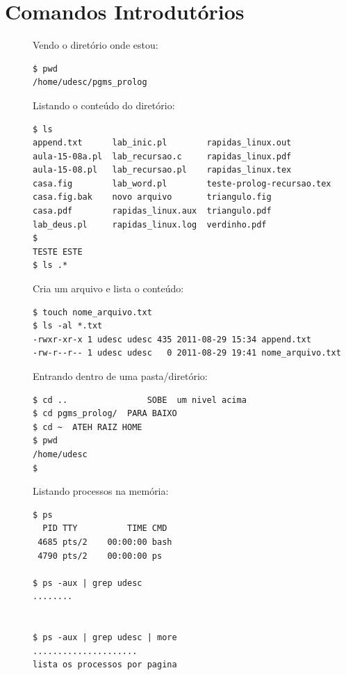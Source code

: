 \documentclass[final,a4paper]{article}
\begin{document}
\section{Comandos Introdutórios}

\begin{description}


\item[] Vendo o diretório onde estou:
\begin{verbatim}
$ pwd
/home/udesc/pgms_prolog
\end{verbatim}


\pagebreak
\item[] Listando o conteúdo do diretório:
\begin{verbatim}
$ ls
append.txt      lab_inic.pl        rapidas_linux.out
aula-15-08a.pl  lab_recursao.c     rapidas_linux.pdf
aula-15-08.pl   lab_recursao.pl    rapidas_linux.tex
casa.fig        lab_word.pl        teste-prolog-recursao.tex
casa.fig.bak    novo arquivo       triangulo.fig
casa.pdf        rapidas_linux.aux  triangulo.pdf
lab_deus.pl     rapidas_linux.log  verdinho.pdf
$ 
TESTE ESTE
$ ls .*
\end{verbatim}

\pagebreak
\item[] Cria um arquivo e lista o conteúdo:
\begin{verbatim}
$ touch nome_arquivo.txt
$ ls -al *.txt
-rwxr-xr-x 1 udesc udesc 435 2011-08-29 15:34 append.txt
-rw-r--r-- 1 udesc udesc   0 2011-08-29 19:41 nome_arquivo.txt
\end{verbatim}

\pagebreak
\item[] Entrando dentro de uma pasta/diretório:
\begin{verbatim}
$ cd ..                SOBE  um nivel acima
$ cd pgms_prolog/  PARA BAIXO
$ cd ~  ATEH RAIZ HOME
$ pwd
/home/udesc
$ 
\end{verbatim}



\pagebreak
\item[] Listando processos na memória:
\begin{verbatim}
$ ps 
  PID TTY          TIME CMD
 4685 pts/2    00:00:00 bash
 4790 pts/2    00:00:00 ps

$ ps -aux | grep udesc
........


$ ps -aux | grep udesc | more
.....................
lista os processos por pagina
\end{verbatim}





\end{description}
\end{document}
